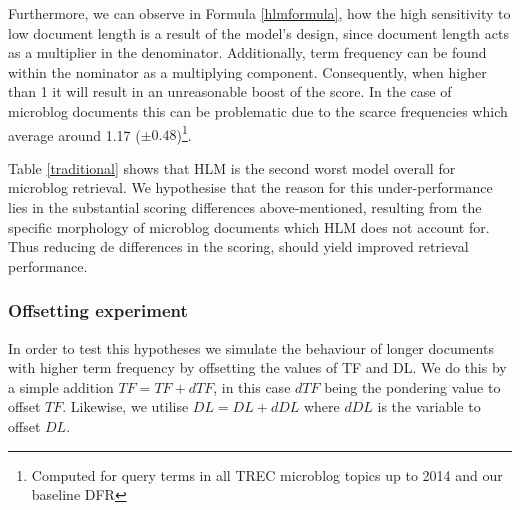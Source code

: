 Furthermore, we can observe in Formula \ref{hlmformula}, how the high sensitivity to low document length is a result of the model's design, since document length acts as a multiplier in the denominator. Additionally, term frequency can be found within the nominator as a multiplying component. Consequently, when higher than 1 it will result in an unreasonable boost of the score. In the case of microblog documents this can be problematic due to the scarce frequencies which average around 1.17 ($\pm 0.48$)\footnote{Computed for query terms in all TREC microblog topics up to 2014 and our baseline DFR}.


 
%
%   
%

Table \ref{traditional} shows that HLM is the second worst model overall for microblog retrieval. We hypothesise that the reason for this under-performance lies in the substantial scoring differences above-mentioned, resulting from the specific morphology of microblog documents which HLM does not account for. Thus reducing de differences in the scoring, should yield improved retrieval performance.

\subsubsection{Offsetting experiment}
In order to test this hypotheses we simulate the behaviour of longer documents with higher term frequency by offsetting the values of TF and DL. We do this by a simple addition \(TF = TF+dTF\), in this case \(dTF\) being the pondering value to offset \(TF\). Likewise, we utilise \(DL = DL+dDL\) where \(dDL\) is the variable to offset \(DL\).

